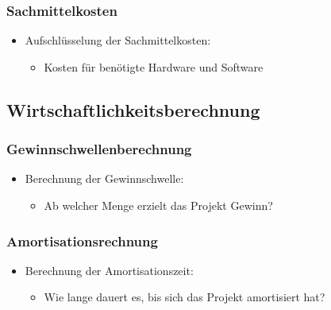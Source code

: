 \subsubsection{Sachmittelkosten}\label{sachmittelkosten}

\begin{itemize}
\item
  Aufschlüsselung der Sachmittelkosten:

  \begin{itemize}
  
  \item
    Kosten für benötigte Hardware und Software
  \end{itemize}
\end{itemize}

\subsection{Wirtschaftlichkeitsberechnung}\label{wirtschaftlichkeitsberechnung}

\subsubsection{Gewinnschwellenberechnung}\label{gewinnschwellenberechnung}

\begin{itemize}
\item
  Berechnung der Gewinnschwelle:

  \begin{itemize}
  
  \item
    Ab welcher Menge erzielt das Projekt Gewinn?
  \end{itemize}
\end{itemize}

\subsubsection{Amortisationsrechnung}\label{amortisationsrechnung}

\begin{itemize}
\item
  Berechnung der Amortisationszeit:

  \begin{itemize}
  
  \item
    Wie lange dauert es, bis sich das Projekt amortisiert hat?
  \end{itemize}
\end{itemize}
